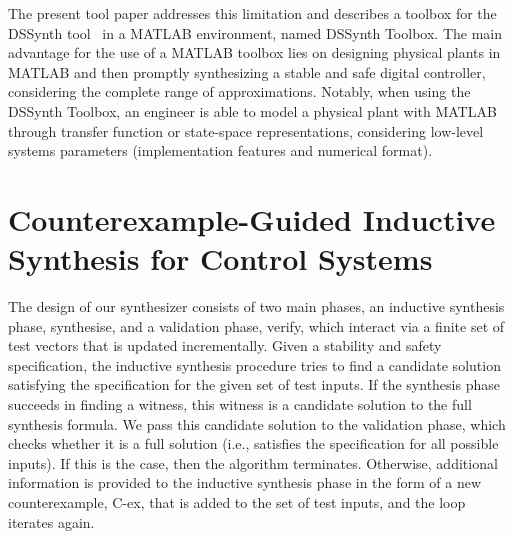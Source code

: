 \documentclass[10pt,conference]{IEEEtran}
\newcommand\tool{{DSSynth Toolbox}\xspace}
\begin{document}
The present tool paper addresses this limitation and describes a toolbox for
the DSSynth tool~\cite{abate2017, abatecav2017} in a MATLAB environment,
named \tool.  The main advantage for the use of a MATLAB toolbox lies on
designing physical plants in MATLAB and then promptly synthesizing a stable
and safe digital controller, considering the complete range of
approximations.  Notably, when using the \tool, an engineer is able to model
a physical plant with MATLAB through transfer function or state-space
representations, considering low-level systems parameters (implementation
features and numerical format).

\section{Counterexample-Guided Inductive Synthesis for Control Systems}
\label{sec:CEGIS}



The design of our synthesizer consists of two main phases, an inductive
synthesis phase, {\sc synthesise}, and a validation phase, {\sc verify},
which interact via a finite set of test vectors that is updated
incrementally.  Given a stability and safety specification, the inductive
synthesis procedure tries to find a candidate solution satisfying the
specification for the given set of test inputs.
%
If the synthesis phase succeeds in finding a witness, this witness is
a candidate solution to the full synthesis formula.  We pass this
candidate solution to the validation phase, which checks whether it is
a full solution (i.e., satisfies the specification for all possible
inputs).  If this is the case, then the algorithm terminates.
Otherwise, additional information is provided to the inductive
synthesis phase in the form of a new counterexample, C-ex, that is added to
the set of test inputs, and the loop iterates again.
\end{document}
